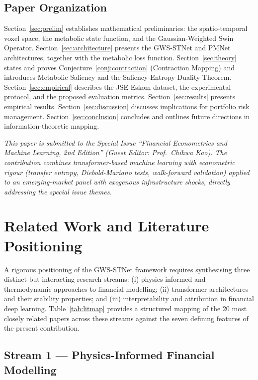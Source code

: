 \documentclass[11pt,a4paper]{article}  %
\theoremstyle{plain}
\theoremstyle{definition}
\theoremstyle{remark}
\begin{document}
\subsection{Paper Organization}
\label{subsec:org}

Section~\ref{sec:prelim} establishes mathematical preliminaries:
the spatio-temporal voxel space, the metabolic state function, and
the Gaussian-Weighted Swin Operator. Section~\ref{sec:architecture}
presents the GWS-STNet and PMNet architectures, together with the
metabolic loss function. Section~\ref{sec:theory} states and proves
Conjecture~\ref{conj:contraction} (Contraction Mapping) and introduces
Metabolic Saliency and the Saliency-Entropy Duality Theorem.
Section~\ref{sec:empirical} describes the JSE-Eskom dataset,
the experimental protocol, and the proposed evaluation metrics.
Section~\ref{sec:results} presents empirical results. Section~\ref{sec:discussion}
discusses implications for portfolio risk management. Section~\ref{sec:conclusion}
concludes and outlines future directions in information-theoretic
mapping.

\noindent\textit{This paper is submitted to the Special Issue
``Financial Econometrics and Machine Learning, 2nd Edition''
(Guest Editor: Prof.\ Chihwa Kao). The contribution combines
transformer-based machine learning with econometric rigour
(transfer entropy, Diebold-Mariano tests, walk-forward validation)
applied to an emerging-market panel with exogenous infrastructure
shocks, directly addressing the special issue themes.}

\section{Related Work and Literature Positioning}
\label{sec:litreview}

A rigorous positioning of the GWS-STNet framework requires
synthesising three distinct but interacting research streams:
(i) physics-informed and thermodynamic approaches to financial
modelling; (ii) transformer architectures and their stability
properties; and (iii) interpretability and attribution in
financial deep learning. Table~\ref{tab:litmap} provides a
structured mapping of the 20 most closely related papers across
these streams against the seven defining features of the
present contribution.

\subsection{Stream 1 — Physics-Informed Financial Modelling}
\label{subsec:stream1}
\end{document}
